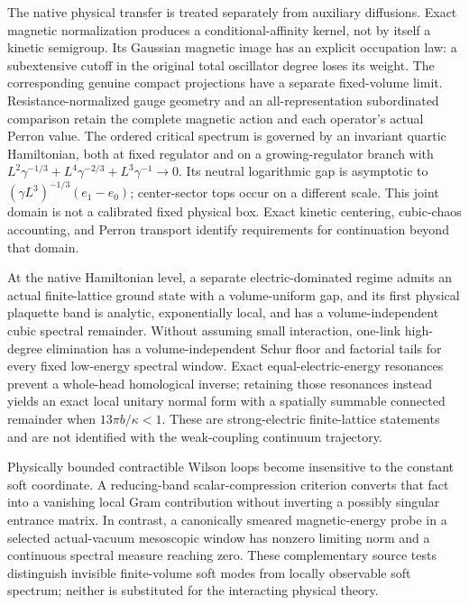 \documentclass[11pt,oneside,openany]{book}
\theoremstyle{definition}
\theoremstyle{remark}
\begin{document}
The native physical transfer is treated separately from auxiliary
diffusions. Exact magnetic normalization produces a conditional-affinity
kernel, not by itself a kinetic semigroup. Its Gaussian magnetic image
has an explicit occupation law: a subextensive cutoff in the original
total oscillator degree loses its weight. The corresponding genuine
compact projections have a separate fixed-volume limit.
Resistance-normalized gauge geometry and an all-representation
subordinated comparison retain the
complete magnetic action and each operator's actual Perron value.
The ordered critical spectrum is governed by an invariant quartic
Hamiltonian, both at fixed regulator and on a growing-regulator branch
with $L^2\gamma^{-1/3}+L^4\gamma^{-2/3}+L^3\gamma^{-1}\to0$.
Its neutral logarithmic gap is asymptotic to
$(\gamma L^3)^{-1/3}(e_1-e_0)$; center-sector tops occur on a
different scale. This joint domain is not a calibrated fixed physical
box. Exact kinetic centering, cubic-chaos accounting, and Perron
transport identify requirements for continuation beyond that domain.

At the native Hamiltonian level, a separate electric-dominated regime
admits an actual finite-lattice ground state with a volume-uniform gap,
and its first physical plaquette band is analytic, exponentially local,
and has a volume-independent cubic spectral remainder. Without assuming
small interaction, one-link high-degree elimination has a
volume-independent Schur floor and factorial tails for every fixed
low-energy spectral window. Exact equal-electric-energy resonances
prevent a whole-head homological inverse; retaining those resonances
instead yields an exact local unitary normal form with a spatially
summable connected remainder when $13\pi b/\kappa<1$. These are
strong-electric finite-lattice statements and are not identified with
the weak-coupling continuum trajectory.

Physically bounded contractible Wilson loops become insensitive to the
constant soft coordinate. A reducing-band scalar-compression criterion
converts that fact into a vanishing local Gram contribution without
inverting a possibly singular entrance matrix. In contrast, a
canonically smeared magnetic-energy probe in a selected actual-vacuum
mesoscopic window has nonzero limiting norm and a continuous spectral
measure reaching zero. These complementary source tests distinguish
invisible finite-volume soft modes from locally observable soft
spectrum; neither is substituted for the interacting physical theory.
\end{document}

